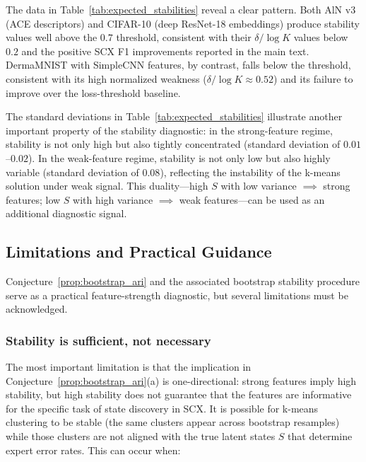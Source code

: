 The data in Table~\ref{tab:expected_stabilities} reveal a clear pattern. Both AlN v3 (ACE descriptors) and CIFAR-10 (deep ResNet-18 embeddings) produce stability values well above the $0.7$ threshold, consistent with their $\delta / \log K$ values below $0.2$ and the positive SCX F1 improvements reported in the main text. DermaMNIST with SimpleCNN features, by contrast, falls below the threshold, consistent with its high normalized weakness ($\delta / \log K \approx 0.52$) and its failure to improve over the loss-threshold baseline.

The standard deviations in Table~\ref{tab:expected_stabilities} illustrate another important property of the stability diagnostic: in the strong-feature regime, stability is not only high but also tightly concentrated (standard deviation of $0.01$--$0.02$). In the weak-feature regime, stability is not only low but also highly variable (standard deviation of $0.08$), reflecting the instability of the k-means solution under weak signal. This duality---high $S$ with low variance $\implies$ strong features; low $S$ with high variance $\implies$ weak features---can be used as an additional diagnostic signal.

\subsection{Limitations and Practical Guidance}

Conjecture~\ref{prop:bootstrap_ari} and the associated bootstrap stability procedure serve as a practical feature-strength diagnostic, but several limitations must be acknowledged.

\subsubsection{Stability is sufficient, not necessary}

The most important limitation is that the implication in Conjecture~\ref{prop:bootstrap_ari}(a) is one-directional: strong features imply high stability, but high stability does not guarantee that the features are informative for the specific task of state discovery in SCX. It is possible for k-means clustering to be stable (the same clusters appear across bootstrap resamples) while those clusters are not aligned with the true latent states $S$ that determine expert error rates. This can occur when:

